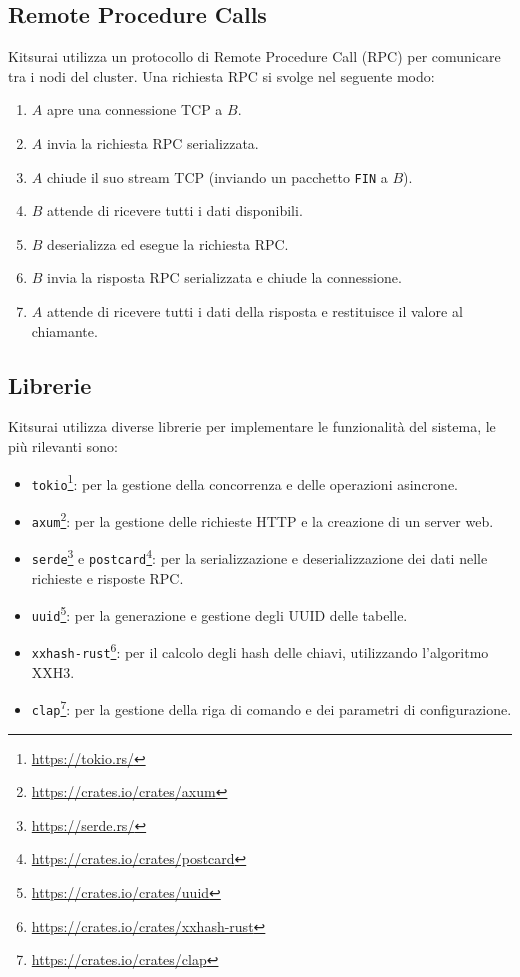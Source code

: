 \subsection{Remote Procedure Calls}
\label{subsec:rpc}

Kitsurai utilizza un protocollo di Remote Procedure Call (RPC) per comunicare tra i nodi del cluster.
Una richiesta RPC si svolge nel seguente modo:
\begin{enumerate}
    \item $A$ apre una connessione TCP a $B$.
    \item $A$ invia la richiesta RPC serializzata.
    \item $A$ chiude il suo stream TCP (inviando un pacchetto \texttt{FIN} a $B$).
    \item $B$ attende di ricevere tutti i dati disponibili.
    \item $B$ deserializza ed esegue la richiesta RPC.
    \item $B$ invia la risposta RPC serializzata e chiude la connessione.
    \item $A$ attende di ricevere tutti i dati della risposta e restituisce il valore al chiamante.
\end{enumerate}

\subsection{Librerie}
\label{subsec:librerie}

Kitsurai utilizza diverse librerie per implementare le funzionalità del sistema, le più rilevanti sono:
\begin{itemize}
    \item \texttt{tokio}\footnote{\url{https://tokio.rs/}}: per la gestione della concorrenza e delle operazioni asincrone.
    \item \texttt{axum}\footnote{\url{https://crates.io/crates/axum}}: per la gestione delle richieste HTTP e la creazione di un server web.
    \item \texttt{serde}\footnote{\url{https://serde.rs/}} e \texttt{postcard}\footnote{\url{https://crates.io/crates/postcard}}: per la serializzazione e deserializzazione dei dati nelle richieste e risposte RPC.
    \item \texttt{uuid}\footnote{\url{https://crates.io/crates/uuid}}: per la generazione e gestione degli UUID delle tabelle.
    \item \texttt{xxhash-rust}\footnote{\url{https://crates.io/crates/xxhash-rust}}: per il calcolo degli hash delle chiavi, utilizzando l'algoritmo XXH3.
    \item \texttt{clap}\footnote{\url{https://crates.io/crates/clap}}: per la gestione della riga di comando e dei parametri di configurazione.
\end{itemize}
